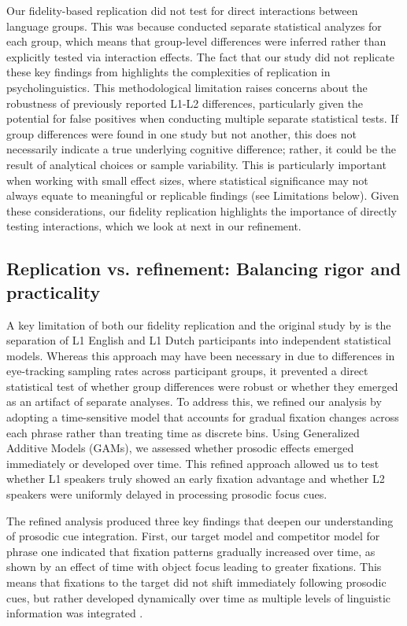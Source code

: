 Our fidelity-based replication did not test for direct interactions between language groups. This was because \textcite{ge2021a} conducted separate statistical analyzes for each group, which means that group-level differences were inferred rather than explicitly tested via interaction effects. The fact that our study did not replicate these key findings from \textcite{ge2021a} highlights the complexities of replication in psycholinguistics. This methodological limitation raises concerns about the robustness of previously reported L1-L2 differences, particularly given the potential for false positives when conducting multiple separate statistical tests. If group differences were found in one study but not another, this does not necessarily indicate a true underlying cognitive difference; rather, it could be the result of analytical choices \parencite{Corretta2023} or sample variability. This is particularly important when working with small effect sizes, where statistical significance may not always equate to meaningful or replicable findings (see Limitations below). Given these considerations, our fidelity replication highlights the importance of directly testing interactions, which we look at next in our refinement.


\subsection{Replication vs. refinement: Balancing rigor and practicality}

A key limitation of both our fidelity replication and the original study by \textcite{ge2021a} is the separation of L1 English and L1 Dutch participants into independent statistical models. Whereas this approach may have been necessary in \textcite{ge2021a} due to differences in eye-tracking sampling rates across participant groups, it prevented a direct statistical test of whether group differences were robust or whether they emerged as an artifact of separate analyses. To address this, we refined our analysis by adopting a time-sensitive model that accounts for gradual fixation changes across each phrase rather than treating time as discrete bins. Using Generalized Additive Models (GAMs), we assessed whether prosodic effects emerged immediately or developed over time. This refined approach allowed us to test whether L1 speakers truly showed an early fixation advantage and whether L2 speakers were uniformly delayed in processing prosodic focus cues.

The refined analysis produced three key findings that deepen our understanding of prosodic cue integration. First, our target model and competitor model for phrase one indicated that fixation patterns gradually increased over time, as shown by an effect of time with object focus leading to greater fixations. This means that fixations to the target did not shift immediately following prosodic cues, but rather developed dynamically over time as multiple levels of linguistic information was integrated \parencite[see][]{Lambrecht1994}.

